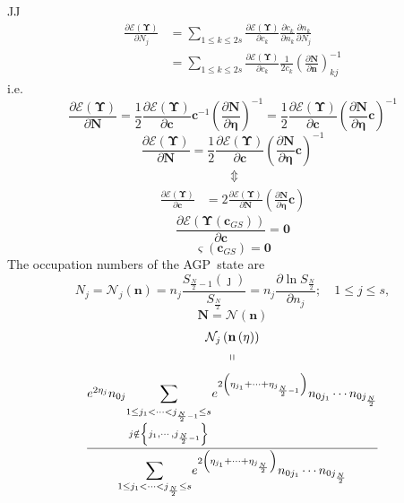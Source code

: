 \documentclass[aps,preprint]{revtex4}%
\begin{document}
JJ%
\begin{align*}
\frac{\partial\mathcal{E}\left(  \mathbf{\Upsilon}\right)  }{\partial N_{j}}
&  =\sum_{1\leq k\leq2s}\frac{\partial\mathcal{E}\left(  \mathbf{\Upsilon
}\right)  }{\partial c_{k}}\frac{\partial c_{k}}{\partial n_{k}}\frac{\partial
n_{k}}{\partial N_{j}}\\
&  =\sum_{1\leq k\leq2s}\frac{\partial\mathcal{E}\left(  \mathbf{\Upsilon
}\right)  }{\partial c_{k}}\frac{1}{2c_{k}}\left(  \frac{\partial\mathbf{N}%
}{\partial\mathbf{n}}\right)  _{kj}^{-1}%
\end{align*}
i.e.%
\[
\frac{\partial\mathcal{E}\left(  \mathbf{\Upsilon}\right)  }{\partial
\mathbf{N}}=\frac{1}{2}\frac{\partial\mathcal{E}\left(  \mathbf{\Upsilon
}\right)  }{\partial\mathbf{c}}\mathbf{c}^{-1}\left(  \frac{\partial
\mathbf{N}}{\partial\mathbf{\eta}}\right)  ^{-1}=\frac{1}{2}\frac
{\partial\mathcal{E}\left(  \mathbf{\Upsilon}\right)  }{\partial\mathbf{c}%
}\left(  \frac{\partial\mathbf{N}}{\partial\mathbf{\eta}}\mathbf{c}\right)
^{-1}%
\]%
\[
\frac{\partial\mathcal{E}\left(  \mathbf{\Upsilon}\right)  }{\partial
\mathbf{N}}=\frac{1}{2}\frac{\partial\mathcal{E}\left(  \mathbf{\Upsilon
}\right)  }{\partial\mathbf{c}}\left(  \frac{\partial\mathbf{N}}%
{\partial\mathbf{\eta}}\mathbf{c}\right)  ^{-1}%
\]%
\begin{align*}
&  \quad\quad\left.  \Updownarrow\right. \\
\frac{\partial\mathcal{E}\left(  \mathbf{\Upsilon}\right)  }{\partial
\mathbf{c}}  &  =2\frac{\partial\mathcal{E}\left(  \mathbf{\Upsilon}\right)
}{\partial\mathbf{N}}\left(  \frac{\partial\mathbf{N}}{\partial\mathbf{\eta}%
}\mathbf{c}\right)
\end{align*}%
\[
\frac{\partial\mathcal{E}\left(  \mathbf{\Upsilon}\left(  \mathbf{c}%
_{GS}\right)  \right)  }{\partial\mathbf{c}}=\mathbf{0}%
\]%
\[
\mathbf{\varsigma}\left(  \mathbf{c}_{GS}\right)  =\mathbf{0}%
\]
The occupation numbers of the AGP\ state are
\[
N_{j}=\mathcal{N}_{j}\left(  \mathbf{n}\right)  =n_{j}\frac{S_{\frac{N}{2}%
-1}\left(  \jmath\right)  }{S_{\frac{N}{2}}}=n_{j}\frac{\partial\ln
S_{\frac{N}{2}}}{\partial n_{j}};\quad1\leq j\leq s,
\]%
\[
\mathbf{N}=\mathcal{N}\left(  \mathbf{n}\right)
\]%
\begin{align*}
&  \mathcal{N}_{j}\left(  \mathbf{n}\left(  \mathbf{\eta}\right)  \right) \\
&  \,\,\,\,\,\,\,\,\,\,\left.  \shortparallel\right.
\end{align*}%
\[
\frac{e^{2\eta_{j}}n_{0j}%
{\displaystyle\sum\limits_{_{\substack{1\leq j_{1}<\cdots<j_{\frac{N}{2}%
-1}\leq s\\j\notin\left\{  j_{1},\cdots,j_{\frac{N}{2}-1}\right\}  }}}}
e^{2\left(  \eta_{j_{1}}+\cdots+\eta_{j_{\frac{N}{2}-1}}\right)  }n_{0j_{1}%
}\cdots n_{0j_{\frac{N}{2}}}}{%
{\displaystyle\sum\limits_{1\leq j_{1}<\cdots<j_{\frac{N}{2}}\leq s}}
e^{2\left(  \eta_{j_{1}}+\cdots+\eta_{j_{\frac{_{N}}{2}}}\right)  }n_{0j_{1}%
}\cdots n_{0j_{\frac{N}{2}}}}%
\]%
\end{document}
